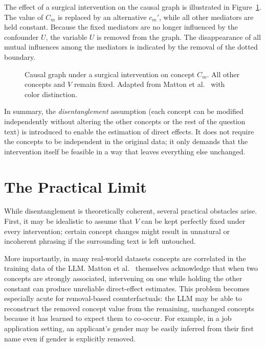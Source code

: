 The effect of a surgical intervention on the causal graph is illustrated in Figure~\ref{fig:matton_dgp_intervened}. The value of $C_m$ is replaced by an alternative $c_m'$, while all other mediators are held constant. Because the fixed mediators are no longer influenced by the confounder $U$, the variable $U$ is removed from the graph. The disappearance of all mutual influences among the mediators is indicated by the removal of the dotted boundary.

\begin{figure}[ht]
	\centering
	
	\caption[Causal graph under a surgical intervention on a single concept]{Causal graph under a surgical intervention on concept $C_m$. All other concepts and $V$ remain fixed. Adapted from Matton et al.~\cite{mattonWalkTalkMeasuring2024} with color distinction.}
	\label{fig:matton_dgp_intervened}
\end{figure}

In summary, the \emph{disentanglement} assumption (each concept can be modified independently without altering the other concepts or the rest of the question text) is introduced to enable the estimation of direct effects. It does not require the concepts to be independent in the original data; it only demands that the intervention itself be feasible in a way that leaves everything else unchanged.

\section{The Practical Limit}
\label{sec:pratical_limit}
While disentanglement is theoretically coherent, several practical obstacles arise. First, it may be idealistic to assume that $V$ can be kept perfectly fixed under every intervention; certain concept changes might result in unnatural or incoherent phrasing if the surrounding text is left untouched.

More importantly, in many real-world datasets concepts are correlated in the training data of the LLM. Matton et al.~\cite{mattonWalkTalkMeasuring2024} themselves acknowledge that when two concepts are strongly associated, intervening on one while holding the other constant can produce unreliable direct-effect estimates. This problem becomes especially acute for removal-based counterfactuals: the LLM may be able to reconstruct the removed concept value from the remaining, unchanged concepts because it has learned to expect them to co-occur. For example, in a job application setting, an applicant’s gender may be easily inferred from their first name even if gender is explicitly removed.

